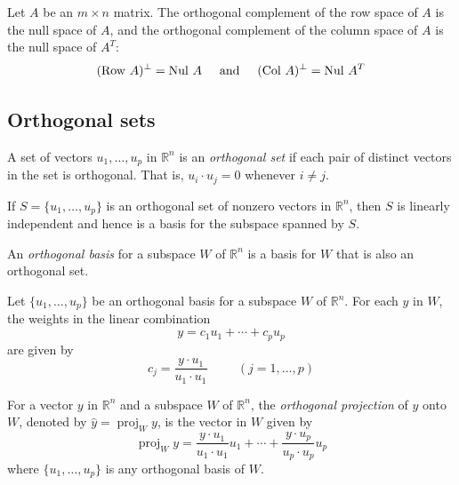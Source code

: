 \documentclass{article}
\DeclareMathOperator{\proj}{proj}
\begin{document}
\begin{thm} 
    Let \(A\) be an \(m\times n\) matrix. The orthogonal complement of the row space of \(A\) is the null space of \(A\), and the orthogonal complement of the column space of \(A\) is the null space of \(A^T\): \[(\text{Row }A)^{\perp}=\text{Nul }A\hspace{.5cm}\text{and}\hspace{.5cm}(\text{Col }A)^{\perp}=\text{Nul }A^T\]
\end{thm}

\subsection{Orthogonal sets}

\begin{defn}
    A set of vectors \(u_1, \ldots, u_p\) in \(\mathbb{R}^n\) is an \emph{orthogonal set} if each pair of distinct vectors in the set is orthogonal. That is, \(u_i \cdot u_j = 0\) whenever \(i \neq j\).
\end{defn}

\begin{thm} 
    If \(S=\{u_1,\ldots,u_p\}\) is an orthogonal set of nonzero vectors in \(\mathbb{R}^n\), then \(S\) is linearly independent and hence is a basis for the subspace spanned by \(S\).
\end{thm}

\begin{defn}
    An \emph{orthogonal basis} for a subspace \(W\) of \(\mathbb{R}^n\) is a basis for \(W\) that is also an orthogonal set.
\end{defn}

\begin{thm}
    Let \(\{u_1,\ldots,u_p\}\) be an orthogonal basis for a subspace \(W\) of \(\mathbb{R}^n\). For each \(y\) in \(W\), the weights in the linear combination \[y=c_1u_1+\cdots+c_pu_p\] are given by \[c_j=\frac{y\cdot u_1}{u_1\cdot u_1}\hspace{1cm}(j=1,\ldots,p)\]
\end{thm}

\begin{defn} 
    For a vector \(y\) in \(\mathbb{R}^n\) and a subspace \(W\) of \(\mathbb{R}^n\), the \emph{orthogonal projection} of \(y\) onto \(W\), denoted by \(\hat{y} = \proj _W y\), is the vector in \(W\) given by \[\proj_W y = \frac{y\cdot u_1}{u_1\cdot u_1}u_1 + \cdots + \frac{y\cdot u_p}{u_p\cdot u_p}u_p\] where \(\{u_1,\ldots,u_p\}\) is any orthogonal basis of \(W\).
\end{defn}
\end{document}
